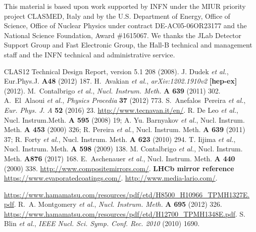 \documentclass[5p,times,twocolumn]{elsarticle}
\def\etal{{\it et al.}}
\begin{document}
This material is based upon work supported by INFN under the MIUR priority project CLASMED, Italy and by the U.S. Department of Energy, Office of Science, Office of Nuclear Physics under contract DE-AC05-06OR23177 and the National Science Foundation, Award \#1615067. We thanks the JLab Detector Support Group and Fast Electronic Group, the Hall-B technical and management staff and the INFN technical and administrative service.

\begin{thebibliography}{00}

 CLAS12 Technical Design Report, version 5.1 208 (2008).
 J. Dudek {\it et al.}, Eur.Phys.J. {\bf A48} (2012) 187.
 H.~Avakian \etal, {\em arXiv:1202.1910v2} {\bf [hep-ex]} (2012).
 M.~Contalbrigo \etal, {\em Nucl. Instrum. Meth.} {\bf A 639} (2011) 302.
 A.~El~Alaoui \etal, {\em Physics Procedia} {\bf 37} (2012) 773.
 S.~Anefalos~Pereira \etal, {\em Eur. Phys. J. A} {\bf 52} (2016) 23.
 \url{http://www.tecnavan.it/en/}.
 R. De Leo {\it et al.}, Nucl. Instrum.Meth. {\bf A 595} (2008) 19; A. Yu. Barnyakov {\it et al.}, Nucl. Instrum. Meth. {\bf A 453} (2000) 326; R. Pereira {\it et al.}, Nucl. Instrum. Meth. {\bf A 639} (2011) 37; R. Forty {\it et al.}, Nucl. Instrum. Meth. {\bf A 623} (2010) 294.
 T. Iijima {\it et al.}, Nucl. Instrum. Meth. {\bf A 598} (2009) 138.
 M. Contalbrigo {\it et al.}, Nucl. Instrum. Meth. {\bf A876} (2017) 168.
 E.~Aschenauer  {\it et al.}, Nucl. Instrum. Meth. {\bf A 440} (2000) 338.
 \url{http://www.compositemirrors.com/}.
   {\bf LHCb mirror reference}
 \url{https://www.evaporatedcoatings.com/}.
 \url{http://www.media-lario.com/}.

 \url{https://www.hamamatsu.com/resources/pdf/etd/H8500\_H10966\_TPMH1327E.pdf}.
 R.~A. Montgomery \etal, {\em Nucl. Instrum. Meth.} {\bf A 695} (2012) 326.
 \url{https://www.hamamatsu.com/resources/pdf/etd/H12700\_TPMH1348E.pdf}.
 S. Blin \etal, {\em IEEE Nucl. Sci. Symp. Conf. Rec. 2010} (2010) 1690.


\end{thebibliography}
\end{document}
